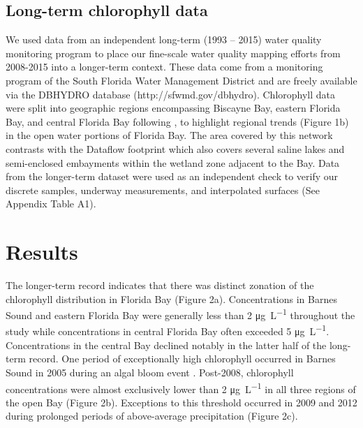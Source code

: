 \subsection{Long-term chlorophyll data}
\label{longtermchl}

We used data from an independent long-term (1993 – 2015) water quality monitoring program to place our fine-scale water quality mapping efforts from 2008-2015 into a longer-term context. These data come from a monitoring program of the South Florida Water Management District and are freely available via the DBHYDRO database (http://sfwmd.gov/dbhydro). Chlorophyll data were split into geographic regions encompassing Biscayne Bay, eastern Florida Bay, and central Florida Bay following \citet{boyer_seasonal_1999}, to highlight regional trends (Figure 1b) in the open water portions of Florida Bay. The area covered by this network contrasts with the Dataflow footprint which also covers several saline lakes and semi-enclosed embayments within the wetland zone adjacent to the Bay. Data from the longer-term dataset were used as an independent check to verify our discrete samples, underway measurements, and interpolated surfaces (See Appendix Table A1).

\section{Results}
\label{results}

The longer-term record indicates that there was distinct zonation of the chlorophyll distribution in Florida Bay (Figure 2a). Concentrations in Barnes Sound and eastern Florida Bay were generally less than 2 \si{\micro\gram\per\liter} throughout the study while concentrations in central Florida Bay often exceeded 5 \si{\micro\gram\per\liter}. Concentrations in the central Bay declined notably in the latter half of the long-term record. One period of exceptionally high chlorophyll occurred in Barnes Sound in 2005 during an algal bloom event \citep{rudnick_2006}. Post-2008, chlorophyll concentrations were almost exclusively lower than 2 \si{\micro\gram\per\liter} in all three regions of the open Bay (Figure 2b). Exceptions to this threshold occurred in 2009 and 2012 during prolonged periods of above-average precipitation (Figure 2c).

